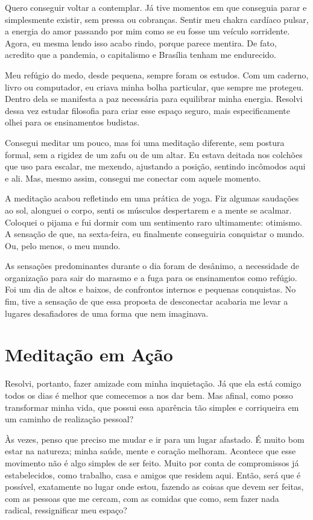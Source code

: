 Quero conseguir voltar a contemplar. Já tive momentos em que conseguia parar e simplesmente existir, sem pressa ou cobranças. Sentir meu chakra cardíaco pulsar, a energia do amor passando por mim como se eu fosse um veículo sorridente. Agora, eu mesma lendo isso acabo rindo, porque parece mentira. De fato, acredito que a pandemia, o capitalismo e Brasília tenham me endurecido.

Meu refúgio do medo, desde pequena, sempre foram os estudos. Com um caderno, livro ou computador, eu criava minha bolha particular, que sempre me protegeu. Dentro dela se manifesta a paz necessária para equilibrar minha energia. Resolvi dessa vez estudar filosofia para criar esse espaço seguro, mais especificamente olhei para os ensinamentos budistas.

Consegui meditar um pouco, mas foi uma meditação diferente, sem postura formal, sem a rigidez de um zafu ou de um altar. Eu estava deitada nos colchões que uso para escalar, me mexendo, ajustando a posição, sentindo incômodos aqui e ali. Mas, mesmo assim, consegui me conectar com aquele momento.

A meditação acabou refletindo em uma prática de yoga. Fiz algumas saudações ao sol, alonguei o corpo, senti os músculos despertarem e a mente se acalmar. Coloquei o pijama e fui dormir com um sentimento raro ultimamente: otimismo. A sensação de que, na sexta-feira, eu finalmente conseguiria conquistar o mundo. Ou, pelo menos, o meu mundo.

As sensações predominantes durante o dia foram de desânimo, a necessidade de organização para sair do marasmo e a fuga para os ensinamentos como refúgio. Foi um dia de altos e baixos, de confrontos internos e pequenas conquistas. No fim, tive a sensação de que essa proposta de desconectar acabaria me levar a lugares desafiadores de uma forma que nem imaginava.

\section{Meditação em Ação}

Resolvi, portanto, fazer amizade com minha inquietação. Já que ela está comigo todos os dias é melhor que comecemos a nos dar bem. Mas afinal, como posso transformar minha vida, que possui essa aparência tão simples e corriqueira em um caminho de realização pessoal?

Às vezes, penso que preciso me mudar e ir para um lugar afastado. É muito bom estar na natureza; minha saúde, mente e coração melhoram. Acontece que esse movimento não é algo simples de ser feito. Muito por conta de compromissos já estabelecidos, como trabalho, casa e amigos que residem aqui. Então, será que é possível, exatamente no lugar onde estou, fazendo as coisas que devem ser feitas, com as pessoas que me cercam, com as comidas que como, sem fazer nada radical, ressignificar meu espaço?

